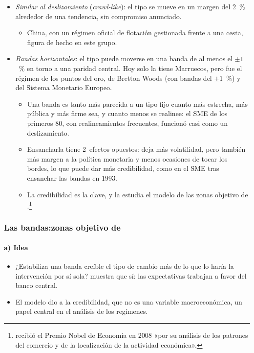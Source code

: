 \documentclass[11pt]{article}
\begin{document}
\begin{itemize}
\begin{itemize}
  \end{itemize}
\item \emph{Similar al deslizamiento} (\emph{crawl-like}): el tipo se mueve en un margen del 2~\% alrededor de una tendencia, sin compromiso anunciado.
  \begin{itemize}
  \item China, con un régimen oficial de flotación gestionada frente a una cesta, figura de hecho en este grupo\nocite{FMI2026InformeAnual}.
  \end{itemize}
\item \emph{Bandas horizontales}: el tipo puede moverse en una banda de al menos el $\pm1$~\% en torno a una paridad central. Hoy solo la tiene Marruecos, pero fue el régimen de los puntos del oro, de Bretton Woods (con bandas del $\pm1$~\%) y del Sistema Monetario Europeo.
  \begin{itemize}
  \item Una banda es tanto más parecida a un tipo fijo cuanto más estrecha, más pública y más firme sea, y cuanto menos se realinee: el SME de los primeros 80, con realineamientos frecuentes, funcionó casi como un deslizamiento.
  \item Ensancharla tiene 2~efectos opuestos: deja más volatilidad, pero también más margen a la política monetaria y menos ocasiones de tocar los bordes, lo que puede dar más credibilidad, como en el SME tras ensanchar las bandas en 1993.
  \item La credibilidad es la clave, y la estudia el modelo de las zonas objetivo de \textcite{Krugman1991Target}.\footnote{ recibió el Premio Nobel de Economía en 2008 «por su análisis de los patrones del comercio y de la localización de la actividad económica»\nocite{Nobel2008Krugman}.}
  \end{itemize}
\end{itemize}

\subsubsection{Las bandas:\cortetitulo zonas objetivo de }\label{sec:krugman}

\paragraph{a) Idea}

\begin{itemize}
\item ¿Estabiliza una banda creíble el tipo de cambio más de lo que lo haría la intervención por sí sola? \textcite{Krugman1991Target} muestra que sí: las expectativas trabajan a favor del banco central.
\item El modelo dio a la credibilidad, que no es una variable macroeconómica, un papel central en el análisis de los regímenes.
\end{itemize}
\end{document}
